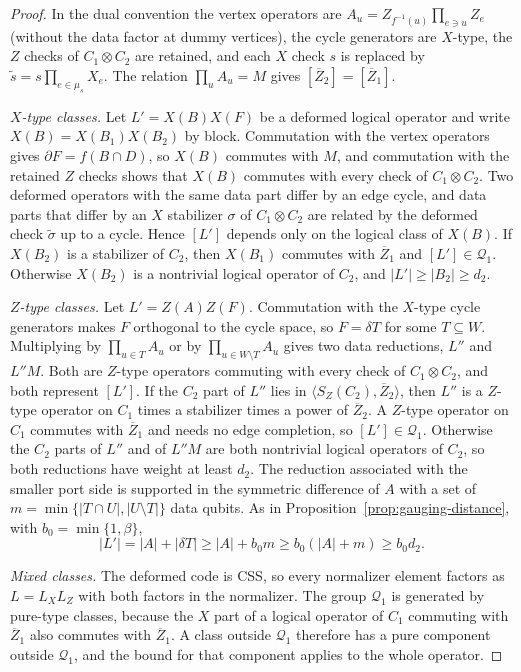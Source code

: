 \documentclass[aps,prx,reprint,superscriptaddress,nofootinbib,floatfix,longbibliography]{revtex4-2}
\theoremstyle{definition}
\begin{document}
\begin{proof}
In the dual convention the vertex operators are
$A_u=Z_{f^{-1}(u)}\prod_{e\ni u}Z_e$ (without the data factor at dummy
vertices), the cycle generators are $X$-type, the $Z$ checks of
$C_1\otimes C_2$ are retained, and each $X$ check $s$ is replaced by
$\widetilde s=s\prod_{e\in\mu_s}X_e$.  The relation $\prod_uA_u=M$ gives
$[\overline Z_2]=[\overline Z_1]$.

\emph{$X$-type classes.}  Let $L'=X(B)X(F)$ be a deformed logical operator
and write $X(B)=X(B_1)X(B_2)$ by block.  Commutation with the vertex
operators gives $\partial F=f(B\cap D)$, so $X(B)$ commutes with $M$, and
commutation with the retained $Z$ checks shows that $X(B)$ commutes with
every check of $C_1\otimes C_2$.  Two deformed operators with the same data
part differ by an edge cycle, and data parts that differ by an $X$ stabilizer
$\sigma$ of $C_1\otimes C_2$ are related by the deformed check
$\widetilde\sigma$ up to a cycle.  Hence $[L']$ depends only on the logical
class of $X(B)$.  If $X(B_2)$ is a stabilizer of $C_2$, then $X(B_1)$
commutes with $\overline Z_1$ and $[L']\in\mathcal Q_1$.  Otherwise $X(B_2)$
is a nontrivial logical operator of $C_2$, and $|L'|\geq|B_2|\geq d_2$.

\emph{$Z$-type classes.}  Let $L'=Z(A)Z(F)$.  Commutation with the $X$-type
cycle generators makes $F$ orthogonal to the cycle space, so $F=\delta T$ for
some $T\subseteq W$.  Multiplying by $\prod_{u\in T}A_u$ or by
$\prod_{u\in W\setminus T}A_u$ gives two data reductions, $L''$ and $L''M$.
Both are $Z$-type operators commuting with every check of $C_1\otimes C_2$,
and both represent $[L']$.  If the $C_2$ part of $L''$ lies in
$\langle S_Z(C_2),\overline Z_2\rangle$, then $L''$ is a $Z$-type operator on
$C_1$ times a stabilizer times a power of $\overline Z_2$.  A $Z$-type
operator on $C_1$ commutes with $\overline Z_1$ and needs no edge completion,
so $[L']\in\mathcal Q_1$.  Otherwise the $C_2$ parts of $L''$ and of $L''M$
are both nontrivial logical operators of $C_2$, so both reductions have weight
at least $d_2$.  The reduction associated with the smaller port side is
supported in the symmetric difference of $A$ with a set of
$m=\min\{|T\cap U|,|U\setminus T|\}$ data qubits.  As in
Proposition~\ref{prop:gauging-distance}, with $b_0=\min\{1,\beta\}$,
\begin{equation*}
 |L'|=|A|+|\delta T|\geq|A|+b_0m\geq b_0(|A|+m)\geq b_0d_2.
\end{equation*}

\emph{Mixed classes.}  The deformed code is CSS, so every normalizer element
factors as $L=L_XL_Z$ with both factors in the normalizer.  The group
$\mathcal Q_1$ is generated by pure-type classes, because the $X$ part of a
logical operator of $C_1$ commuting with $\overline Z_1$ also commutes with
$\overline Z_1$.  A class outside $\mathcal Q_1$ therefore has a pure
component outside $\mathcal Q_1$, and the bound for that component applies to
the whole operator.
\end{proof}
\end{document}
